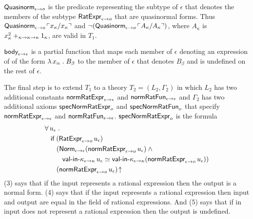 \documentclass[fleqn]{llncs}
\begin{document}
  \item \bsp $\mbox{\sf Quasinorm}_{\epsilon \rightarrow o}$ is the predicate
    representing the subtype of $\epsilon$ that denotes the members of
    the subtype $\mbox{\sf RatExpr}_{\epsilon \rightarrow o}$ that are
    quasinormal forms.  Thus $\mbox{\sf Quasinorm}_{\epsilon \rightarrow o}
    \, \ulcorner x_\kappa/x_\kappa\urcorner$ and $\neg(\mbox{\sf Quasinorm}_{\epsilon \rightarrow o} \,
    \ulcorner A_\kappa/A_\kappa\urcorner)$, where $A_\kappa$ is
    $x^{2}_{\kappa} +_{\kappa \rightarrow \kappa \rightarrow \kappa}
    1_\kappa$, are valid in $T_1$. \esp

  \item $\mbox{\sf body}_{\epsilon \rightarrow \epsilon}$ is a partial
    function that maps each member of $\epsilon$ denoting an
    expression of of the form $\lambda\, x_\alpha \mathrel. B_\beta$ to
    the member of $\epsilon$ that denotes $B_\beta$ and is undefined
    on the rest of $\epsilon$.

\ee

\bsp The final step is to extend $T_1$ to a theory $T_2 =
(L_2,\Gamma_2)$ in which $L_2$ has two additional constants
$\mbox{\sf normRatExpr}_{\epsilon \rightarrow \epsilon}$ and
$\mbox{\sf normRatFun}_{\epsilon \rightarrow \epsilon}$ and $\Gamma_2$ has
two additional axioms $\mbox{\sf specNormRatExpr}_o$ and
$\mbox{\sf specNormRatFun}_o$ that specify $\mbox{\sf normRatExpr}_{\epsilon
  \rightarrow \epsilon}$ and $\mbox{\sf normRatFun}_{\epsilon \rightarrow
  \epsilon}$. $\mbox{\sf specNormRatExpr}_o$ is the formula\esp
\begin{align}
&
\forall\, u_\epsilon \mathrel.\\
& \hspace*{2ex}
\mbox{\sf if} \; (\mbox{\sf RatExpr}_{\epsilon \rightarrow o} \, u_\epsilon)\\
& \hspace*{4ex}
(\mbox{\sf Norm}_{\epsilon \rightarrow \epsilon}(\mbox{\sf normRatExpr}_{\epsilon \rightarrow o} \, u_\epsilon) \wedge {}\\
& \hspace*{6ex}
\mbox{\sf val-in-}\kappa_{\epsilon \rightarrow \kappa} \, u_\epsilon \simeq
\mbox{\sf val-in-}\kappa_{\epsilon \rightarrow \kappa}(\mbox{\sf normRatExpr}_{\epsilon \rightarrow o} \, u_\epsilon))\\
& \hspace*{4ex}
(\mbox{\sf normRatExpr}_{\epsilon \rightarrow o} \, u_\epsilon)\!\uparrow
\end{align}
(3) says that if the input represents a rational expression then the
output is a normal form.  (4) says that if the input represents a
rational expression then input and output are equal in the field of
rational expressions.  And (5) says that if in input does not
represent a rational expression then the output is undefined.
\end{document}
